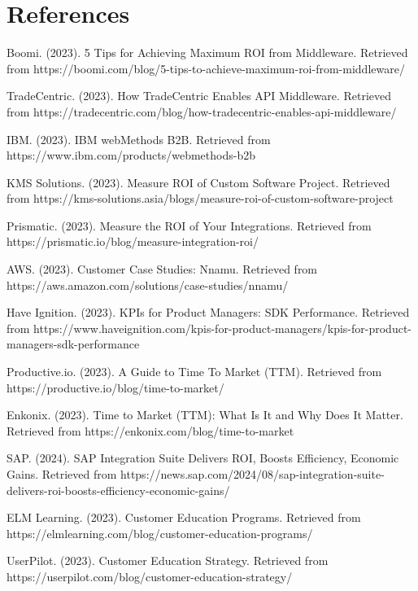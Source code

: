 \documentclass[11pt,a4paper]{article}
\begin{document}
\section*{References}

\begin{thebibliography}{99}

 Boomi. (2023). 5 Tips for Achieving Maximum ROI from Middleware. Retrieved from https://boomi.com/blog/5-tips-to-achieve-maximum-roi-from-middleware/

 TradeCentric. (2023). How TradeCentric Enables API Middleware. Retrieved from https://tradecentric.com/blog/how-tradecentric-enables-api-middleware/

 IBM. (2023). IBM webMethods B2B. Retrieved from https://www.ibm.com/products/webmethods-b2b

 KMS Solutions. (2023). Measure ROI of Custom Software Project. Retrieved from https://kms-solutions.asia/blogs/measure-roi-of-custom-software-project

 Prismatic. (2023). Measure the ROI of Your Integrations. Retrieved from https://prismatic.io/blog/measure-integration-roi/

 AWS. (2023). Customer Case Studies: Nnamu. Retrieved from https://aws.amazon.com/solutions/case-studies/nnamu/

 Have Ignition. (2023). KPIs for Product Managers: SDK Performance. Retrieved from https://www.haveignition.com/kpis-for-product-managers/kpis-for-product-managers-sdk-performance

 Productive.io. (2023). A Guide to Time To Market (TTM). Retrieved from https://productive.io/blog/time-to-market/

 Enkonix. (2023). Time to Market (TTM): What Is It and Why Does It Matter. Retrieved from https://enkonix.com/blog/time-to-market

 SAP. (2024). SAP Integration Suite Delivers ROI, Boosts Efficiency, Economic Gains. Retrieved from https://news.sap.com/2024/08/sap-integration-suite-delivers-roi-boosts-efficiency-economic-gains/

 ELM Learning. (2023). Customer Education Programs. Retrieved from https://elmlearning.com/blog/customer-education-programs/

 UserPilot. (2023). Customer Education Strategy. Retrieved from https://userpilot.com/blog/customer-education-strategy/


\end{thebibliography}
\end{document}
